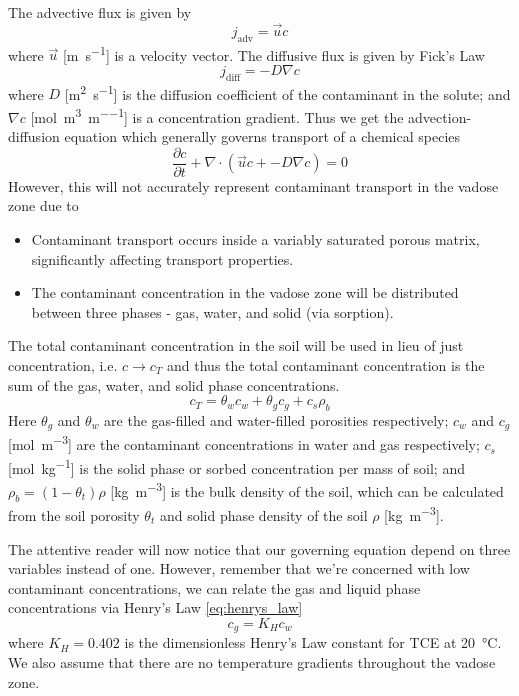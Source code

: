 The advective flux is given by
\begin{equation}
  j_\mathrm{adv} = \vec{u} c
\end{equation}
where $\vec{u}$ [\si{\metre\per\second}] is a velocity vector.
The diffusive flux is given by Fick's Law
\begin{equation}
  j_\mathrm{diff} = -D \nabla c
\end{equation}
where $D$ [\si{\metre\squared\per\second}] is the diffusion coefficient of the contaminant in the solute;
and $\nabla c$ [\si{\mol\per\metre\cubed\per\metre}] is a concentration gradient.
Thus we get the advection-diffusion equation which generally governs transport of a chemical species
\begin{equation}
  \frac{\partial c}{\partial t} + \nabla \cdot(\vec{u} c + -D \nabla c) = 0
\end{equation}
However, this will not accurately represent contaminant transport in the vadose zone due to
\begin{itemize}
  \item Contaminant transport occurs inside a variably saturated porous matrix, significantly affecting transport properties.
  \item The contaminant concentration in the vadose zone will be distributed between three phases - gas, water, and solid (via sorption).
\end{itemize}\par

The total contaminant concentration in the soil will be used in lieu of just concentration, i.e. $c \rightarrow c_T$ and thus the total contaminant concentration is the sum of the gas, water, and solid phase concentrations.
\begin{equation}
  c_T = \theta_w c_w + \theta_g c_g + c_s \rho_b
\end{equation}
Here $\theta_g$ and $\theta_w$ are the gas-filled and water-filled porosities respectively;
$c_w$ and $c_g$ [\si{\mol\per\metre\cubed}] are the contaminant concentrations in water and gas respectively;
$c_s$ [\si{\mol\per\kilogram}] is the solid phase or sorbed concentration per mass of soil;
and $\rho_b = (1-\theta_t) \rho$ [\si{\kilogram\per\metre\cubed}] is the bulk density of the soil, which can be calculated from the soil porosity $\theta_t$ and solid phase density of the soil $\rho$ [\si{\kilogram\per\metre\cubed}].\par

The attentive reader will now notice that our governing equation depend on three variables instead of one.
However, remember that we're concerned with low contaminant concentrations, we can relate the gas and liquid phase concentrations via Henry's Law \eqref{eq:henrys_law}
\begin{equation}\label{eq:henrys_law}
  c_g = K_H c_w
\end{equation}
where $K_H = 0.402$ is the dimensionless Henry's Law constant for TCE at \SI{20}{\degreeCelsius}. %
We also assume that there are no temperature gradients throughout the vadose zone.\par

